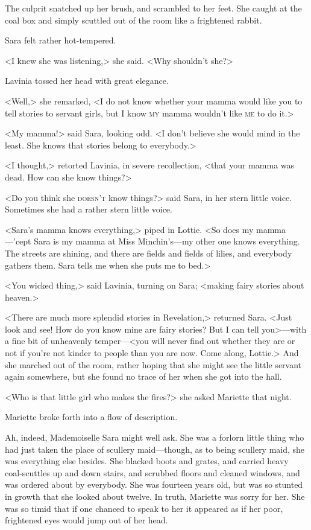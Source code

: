 The culprit snatched up her brush, and scrambled to her feet. She caught at the coal box and simply scuttled out of the room like a frightened rabbit.

Sara felt rather hot-tempered.

<I knew she was listening,> she said. <Why shouldn't she?>

Lavinia tossed her head with great elegance.

<Well,> she remarked, <I do not know whether your mamma would like you to tell stories to servant girls, but I know \textsc{my} mamma wouldn't like \textsc{me} to do it.>

<My mamma!> said Sara, looking odd. <I don't believe she would mind in the least. She knows that stories belong to everybody.>

<I thought,> retorted Lavinia, in severe recollection, <that your mamma was dead. How can she know things?>

<Do you think she \textsc{doesn't} know things?> said Sara, in her stern little voice. Sometimes she had a rather stern little voice.

<Sara's mamma knows everything,> piped in Lottie. <So does my mamma—'cept Sara is my mamma at Miss Minchin's—my other one knows everything. The streets are shining, and there are fields and fields of lilies, and everybody gathers them. Sara tells me when she puts me to bed.>

<You wicked thing,> said Lavinia, turning on Sara; <making fairy stories about heaven.>

<There are much more splendid stories in Revelation,> returned Sara. <Just look and see! How do you know mine are fairy stories? But I can tell you>—with a fine bit of unheavenly temper—<you will never find out whether they are or not if you're not kinder to people than you are now. Come along, Lottie.> And she marched out of the room, rather hoping that she might see the little servant again somewhere, but she found no trace of her when she got into the hall.

<Who is that little girl who makes the fires?> she asked Mariette that night.

Mariette broke forth into a flow of description.

Ah, indeed, Mademoiselle Sara might well ask. She was a forlorn little thing who had just taken the place of scullery maid—though, as to being scullery maid, she was everything else besides. She blacked boots and grates, and carried heavy coal-scuttles up and down stairs, and scrubbed floors and cleaned windows, and was ordered about by everybody. She was fourteen years old, but was so stunted in growth that she looked about twelve. In truth, Mariette was sorry for her. She was so timid that if one chanced to speak to her it appeared as if her poor, frightened eyes would jump out of her head.

